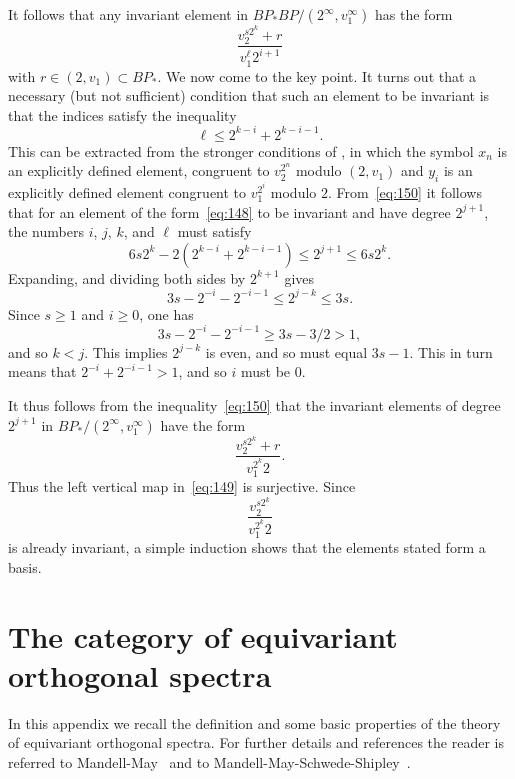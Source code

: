 \documentclass{amsart}
\theoremstyle{definition}
\theoremstyle{remark}
\newcommand{\bpstarbp}{BP_{\ast}BP}
\newcommand{\bpstar}{BP_{\ast}}
\begin{document}
It follows that any invariant element in $\bpstarbp/(2^{\infty},
v_{1}^{\infty})$ has the form 
\begin{equation}
\label{eq:148}
\frac{v_{2}^{s 2^{k}} + r}{v_{1}^{\ell}2^{i+1}}
\end{equation}
with $r\in (2,v_{1})\subset \bpstar$.  We now come to the key point.
It turns out that a necessary (but not sufficient) condition that such
an element to be invariant is that the indices satisfy the inequality
\begin{equation}
\label{eq:150}
\ell \le 2^{k-i}+ 2^{k-i-1}.
\end{equation}
This can be extracted from the stronger conditions of
\cite[Theorem~3.3]{shimomura81:_novik_rm_ext_sp2_at_prime}, in which
the symbol $x_{n}$ is an explicitly defined element, congruent to
$v_{2}^{2^{n}}$ modulo $(2,v_{1})$ and $y_{i}$ is an explicitly
defined element congruent to $v_{1}^{2^{i}}$ modulo $2$.
From~\eqref{eq:150} it follows that for an element of the
form~\eqref{eq:148} to be invariant and have degree $2^{j+1}$, the
numbers $i$, $j$, $k$, and $\ell$ must satisfy
\[
6 s 2^{k} -2(2^{k-i}+2^{k-i-1})\le 2^{j+1} \le  6 s 2^{k}.
\]
Expanding, and dividing both sides by $2^{k+1}$ gives
\[
3 s -2^{-i} - 2^{-i-1} \le 2^{j-k} \le  3s.
\]
Since $s\ge 1$ and $i\ge 0$, one has 
\[
3 s -2^{-i} - 2^{-i-1} \ge 3s - 3/2 > 1,
\]
and so $k< j$.  This implies $2^{j-k}$ is even, and so must equal
$3s-1$.  This in turn means that $2^{-i} + 2^{-i-1}>1$, and so $i$
must be $0$.

It thus follows from the inequality~\eqref{eq:150} that the invariant
elements of degree $2^{j+1}$ in $\bpstar/(2^{\infty},v_{1}^{\infty})$
have the form
\[
\frac{v_{2}^{s 2^{k}} + r}{v_{1}^{2^{k}}2}.
\]
Thus the left vertical map in~\eqref{eq:149} is surjective.   Since 
\[
\frac{v_{2}^{s 2^{k}}}{v_{1}^{2^{k}}2}
\]
is already invariant, a simple induction shows that the elements
stated form a basis.

\appendix


\section{The category of equivariant orthogonal spectra}
\label{sec:equiv-orth-spectra}

In this appendix we recall the definition and some basic properties of
the theory of equivariant orthogonal spectra.   For further details
and references the reader is referred to Mandell-May~\cite{MR1922205}
and to Mandell-May-Schwede-Shipley~\cite{MR1806878}.
\end{document}
